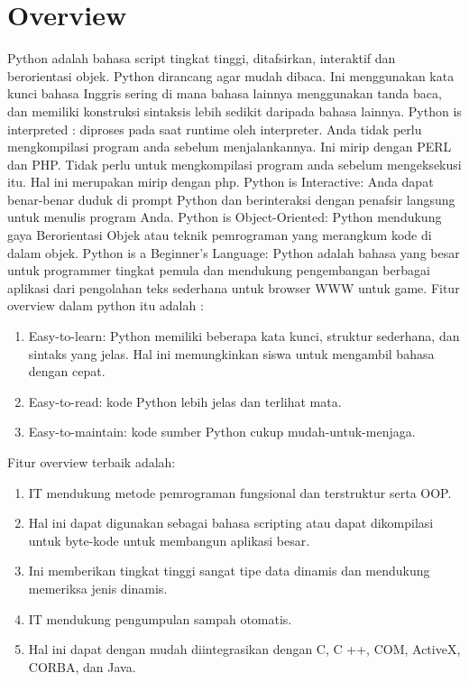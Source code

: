 
\section{Overview}
Python adalah bahasa script tingkat tinggi, ditafsirkan, interaktif dan berorientasi objek. Python dirancang agar mudah dibaca. Ini menggunakan kata kunci bahasa Inggris sering di mana bahasa lainnya menggunakan tanda baca, dan memiliki konstruksi sintaksis lebih sedikit daripada bahasa lainnya.
Python is interpreted : diproses pada saat runtime oleh interpreter. Anda tidak perlu mengkompilasi program anda sebelum menjalankannya. Ini mirip dengan PERL dan PHP.
Tidak perlu untuk mengkompilasi program anda sebelum mengeksekusi itu. Hal ini merupakan mirip dengan php.
Python is Interactive: Anda dapat benar-benar duduk di prompt Python dan berinteraksi dengan penafsir langsung untuk menulis program Anda.
Python is Object-Oriented: Python mendukung gaya Berorientasi Objek atau teknik pemrograman yang merangkum kode di dalam objek.
Python is a Beginner's Language: Python adalah bahasa yang besar untuk programmer tingkat pemula dan mendukung pengembangan berbagai aplikasi dari pengolahan teks sederhana untuk browser WWW untuk game.
Fitur overview dalam python itu adalah :
\begin {enumerate}
\item Easy-to-learn: Python memiliki beberapa kata kunci, struktur sederhana, dan sintaks yang jelas. Hal ini memungkinkan siswa untuk mengambil bahasa dengan cepat.
\item Easy-to-read: kode Python lebih jelas dan terlihat mata.
\item Easy-to-maintain: kode sumber Python cukup mudah-untuk-menjaga.
\end {enumerate}

Fitur overview terbaik adalah:
\begin {enumerate}
\item IT mendukung metode pemrograman fungsional dan terstruktur serta OOP.
\item Hal ini dapat digunakan sebagai bahasa scripting atau dapat dikompilasi untuk byte-kode untuk membangun aplikasi besar.
\item Ini memberikan tingkat tinggi sangat tipe data dinamis dan mendukung memeriksa jenis dinamis.
\item IT mendukung pengumpulan sampah otomatis.
\item Hal ini dapat dengan mudah diintegrasikan dengan C, C ++, COM, ActiveX, CORBA, dan Java.
\end {enumerate}

